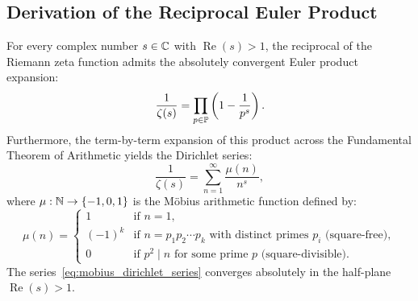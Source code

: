 \subsection{Derivation of the Reciprocal Euler Product}

\begin{theorem}
\label{thm:reciprocal_euler_product}
\leanok
For every complex number $s \in \mathbb{C}$ with $\operatorname{Re}(s) > 1$, the reciprocal of the Riemann zeta function admits the absolutely convergent Euler product expansion:
\begin{equation}
\label{eq:reciprocal_euler_product}
\frac{1}{\zeta(s)} = \prod_{p \in \mathbb{P}} \left(1 - \frac{1}{p^s}\right).
\end{equation}
Furthermore, the term-by-term expansion of this product across the Fundamental Theorem of Arithmetic yields the Dirichlet series:
\begin{equation}
\label{eq:mobius_dirichlet_series}
\frac{1}{\zeta(s)} = \sum_{n=1}^\infty \frac{\mu(n)}{n^s},
\end{equation}
where $\mu : \mathbb{N} \to \{-1, 0, 1\}$ is the M\"obius arithmetic function defined by:
\begin{equation}
\mu(n) = \begin{cases}
1 & \text{if } n = 1, \\
(-1)^k & \text{if } n = p_1 p_2 \cdots p_k \text{ with distinct primes } p_i \text{ (square-free)}, \\
0 & \text{if } p^2 \mid n \text{ for some prime } p \text{ (square-divisible)}.
\end{cases}
\end{equation}
The series~\eqref{eq:mobius_dirichlet_series} converges absolutely in the half-plane $\operatorname{Re}(s) > 1$.
\end{theorem}

